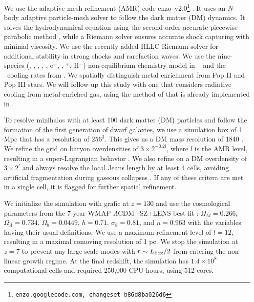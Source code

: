 \documentclass[apjl]{emulateapj}
\begin{document}
We use the adaptive mesh refinement (AMR) code
enzo~v2.0\footnote{\texttt{enzo.googlecode.com, changeset
    b86d8ba026d6}} \citep{OShea2004}.  It uses an $N$-body adaptive
particle-mesh solver \citep{Efstathiou85} to follow the dark matter
(DM) dynamics.  It solves the hydrodynamical equation using the
second-order accurate piecewise parabolic method \citep{Woodward84,
  Bryan95}, while a Riemann solver ensures accurate shock capturing
with minimal viscosity.  We use the recently added HLLC Riemann solver
\citep{Toro94_HLLC} for additional stability in strong shocks and
rarefaction waves.  We use the nine-species (, ,
, , , e$^-$, \hh, \hh$^+$, H$^-$)
non-equilibrium chemistry model in \enzo~\citep{Abel97, Anninos97} and
the \hh~cooling rates from \citet{Glover08_Rates}.  We spatially
distinguish metal enrichment from Pop II and Pop III stars.  We will
follow-up this study with one that considers radiative cooling from
metal-enriched gas, using the method of \citet{2008MNRAS.385.1443S}
that is already implemented in \enzo.

To resolve minihalos with at least 100 dark matter (DM) particles and
follow the formation of the first generation of dwarf galaxies, we use
a simulation box of 1 Mpc that has a resolution of $256^3$.  This
gives us a DM mass resolution of 1840 \Ms.  We refine the grid on
baryon overdensities of $3 \times 2^{-0.2l}$, where $l$ is the AMR
level, resulting in a super-Lagrangian behavior \citep[also
  see][]{OShea08}.  We also refine on a DM overdensity of $3 \times
2^l$ and always resolve the local Jeans length by at least 4 cells,
avoiding artificial fragmentation during gaseous collapses
\citep{Truelove97}.  If any of these critera are met in a single cell,
it is flagged for further spatial refinement.  

We initialize the simulation with grafic \citep{Bertschinger01} at $z
= 130$ and use the cosmological parameters from the 7-year WMAP
$\Lambda$CDM+SZ+LENS best fit \citep{WMAP7}: $\Omega_M = 0.266$,
$\Omega_\Lambda = 0.734$, $\Omega_b = 0.0449$, $h = 0.71$, $\sigma_8 =
0.81$, and $n = 0.963$ with the variables having their usual
definitions.  We use a maximum refinement level of $l = 12$, resulting
in a maximal comoving resolution of 1 pc.  We stop the simulation at
$z=7$ to prevent any large-scale modes with $r \sim L_{\rm box}/2$
from entering the non-linear growth regime.  At the final redshift,
the simulation has $1.4 \times 10^8$ computational cells and required
250,000 CPU hours, using 512 cores.
\end{document}
